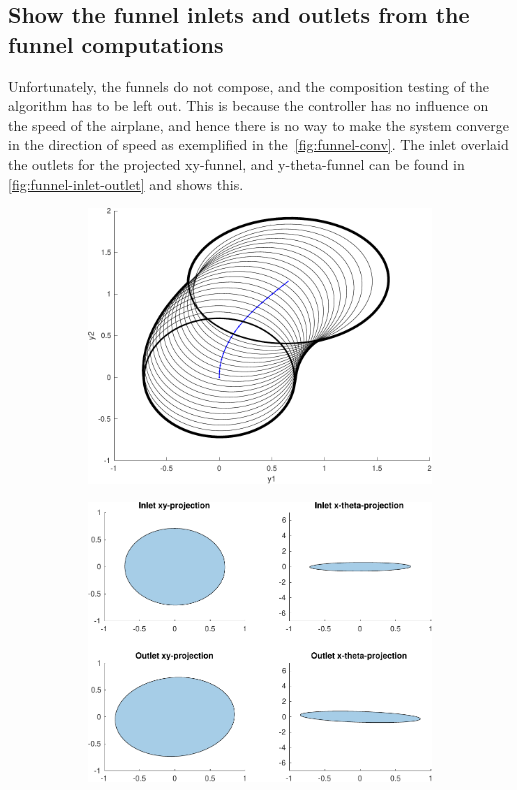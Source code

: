 \subsection{Show the funnel inlets and outlets from the funnel computations}
\label{subsec:funnel-no-composable}

Unfortunately, the funnels do not compose, and the composition testing of the
algorithm has to be left out. This is because the controller has no influence on
the speed of the airplane, and hence there is no way to make the system converge
in the direction of speed as exemplified in the~\cref{fig:funnel-conv}. The
inlet overlaid the outlets for the projected xy-funnel, and y-theta-funnel can
be found in \cref{fig:funnel-inlet-outlet} and shows this.

\begin{figure}
  \centering
  \begin{subfigure}[b]{0.4\textwidth}
    \includegraphics[width=\textwidth]{figures/experiments/sos-calculation}
  \end{subfigure}
  \quad
  \begin{subfigure}[b]{0.4\textwidth}
    \includegraphics[width=\textwidth]{figures/experiments/sos-calculation-inlet-outlet}

\end{subfigure}
\end{figure}

